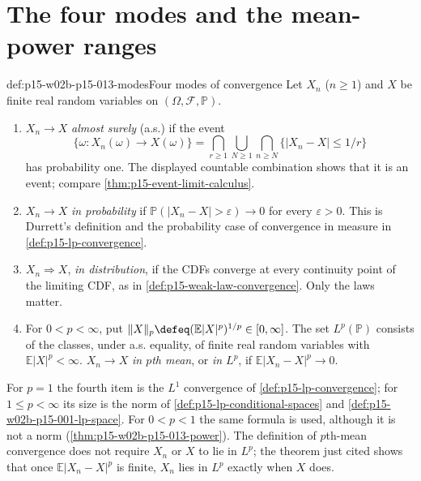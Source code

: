 \section{The four modes and the mean-power ranges}
\label{sec:p15-w02b-p15-013-definitions}

\begin{hbdefinition}{def:p15-w02b-p15-013-modes}{Four modes of convergence}
Let \(X_n\) (\(n\geq1\)) and \(X\) be finite real random variables on
\((\Omega,\mathcal F,\mathbb P)\).
\begin{enumerate}
\item \(X_n\to X\) \emph{almost surely} (a.s.) if the event
      \[
       \{\omega:X_n(\omega)\to X(\omega)\}=
       \bigcap_{r\geq1}\bigcup_{N\geq1}\bigcap_{n\geq N}
       \{|X_n-X|\leq1/r\}
      \]
      has probability one. The displayed countable combination shows
      that it is an event; compare \cref{thm:p15-event-limit-calculus}.
\item \(X_n\to X\) \emph{in probability} if
      \(\mathbb P(|X_n-X|>\varepsilon)\to0\) for every
      \(\varepsilon>0\). This is Durrett's definition
      \cite[p.~56]{DurrettPTEAuthor2019} and the probability case of
      convergence in measure in \cref{def:p15-lp-convergence}.
\item \(X_n\Rightarrow X\), \emph{in distribution}, if the CDFs
      converge at every continuity point of the limiting CDF, as in
      \cref{def:p15-weak-law-convergence}. Only the laws matter.
\item For \(0<p<\infty\), put
      \(\|X\|_p\defeq(\mathbb E|X|^p)^{1/p}\in[0,\infty]\). The set
      \(L^p(\mathbb P)\) consists of the classes, under a.s. equality,
      of finite real random variables with \(\mathbb E|X|^p<\infty\).
      \(X_n\to X\) \emph{in \(p\)th mean}, or \emph{in \(L^p\)}, if
      \(\mathbb E|X_n-X|^p\to0\).
\end{enumerate}
For \(p=1\) the fourth item is the \(L^1\) convergence of
\cref{def:p15-lp-convergence}; for \(1\leq p<\infty\) its size is the
norm of \cref{def:p15-lp-conditional-spaces} and
\cref{def:p15-w02b-p15-001-lp-space}. For \(0<p<1\) the same formula
is used, although it is not a norm (\cref{thm:p15-w02b-p15-013-power}).
The definition of \(p\)th-mean convergence does not require
\(X_n\) or \(X\) to lie in \(L^p\); the theorem just cited shows that
once \(\mathbb E|X_n-X|^p\) is finite, \(X_n\) lies in \(L^p\) exactly
when \(X\) does.
\end{hbdefinition}

